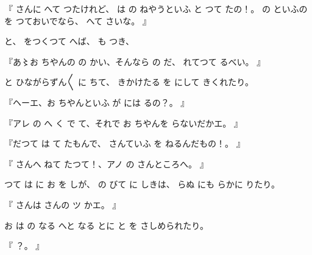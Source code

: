 『
さんに
へて
つたけれど、
は
の
ねやうといふ
と
つて
たの！。
の
といふのを
つておいでなら、
へて
さいな。
』

と、
をつくつて
へば、
も
つき、

『あ〻お
ちやんの
の
かい、そんなら
の
だ、
れてつて
るべい。
』

と
ひながらずん〳〵
に
ちて、
きかけたる
を
にして
きくれたり。

『ヘーエ、お
ちやんといふ
が
には
るの？。
』

『アレ
の
へ
く
で
て、それで
お
ちやんを
らないだかエ。
』

『だつて
は
て
たもんで、
さんていふ
を
ねるんだもの！。
』

『
さんへ
ねて
たつて！、アノ
の
さんところへ。
』

つて
は
に
お
を
しが、
の
びて
に
しきは、
らぬ
にも
らかに
りたり。

『
さんは
さんの
ツ
かエ。
』

お
は
の
なる
へと
なる
とに
と
を
さしめられたり。

『
？。
』

